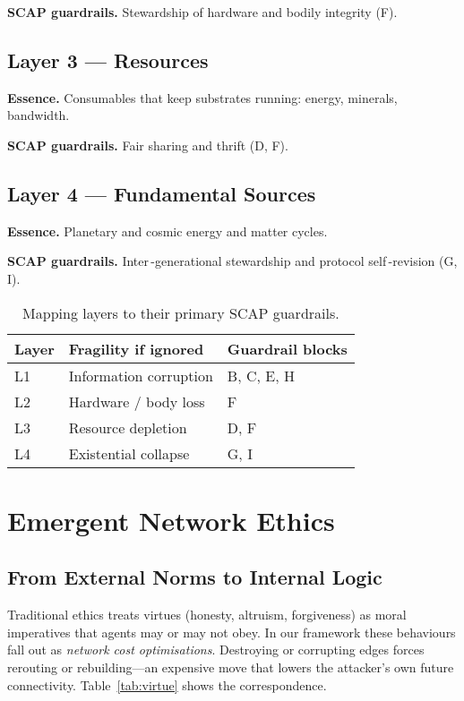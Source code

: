 \documentclass[11pt]{article}
\begin{document}
\textbf{SCAP guardrails.}  Stewardship of hardware and bodily integrity (F).

\subsection{Layer 3 — Resources}
\textbf{Essence.}  Consumables that keep substrates running: energy, minerals, bandwidth.

\textbf{SCAP guardrails.}  Fair sharing and thrift (D, F).

\subsection{Layer 4 — Fundamental Sources}
\textbf{Essence.}  Planetary and cosmic energy and matter cycles.

\textbf{SCAP guardrails.}  Inter\,-generational stewardship and protocol self\,-revision (G, I).

\begin{table}[h]\centering
  \caption{Mapping layers to their primary SCAP guardrails.}
  \label{tab:mapping}
  \begin{tabular}{@{}lll@{}}
    \toprule
    Layer & Fragility if ignored & Guardrail blocks \\
    \midrule
    L1 & Information corruption & B, C, E, H \\
    L2 & Hardware / body loss  & F \\
    L3 & Resource depletion     & D, F \\
    L4 & Existential collapse   & G, I \\
    \bottomrule
  \end{tabular}
\end{table}

\section{Emergent Network Ethics}\label{sec:ethics}
\subsection{From External Norms to Internal Logic}
Traditional ethics treats virtues (honesty, altruism, forgiveness) as moral imperatives that agents may or may not obey.  In our framework these behaviours fall out as \emph{network cost optimisations}.  Destroying or corrupting edges forces rerouting or rebuilding---an expensive move that lowers the attacker’s own future connectivity.  Table~\ref{tab:virtue} shows the correspondence.
\end{document}
